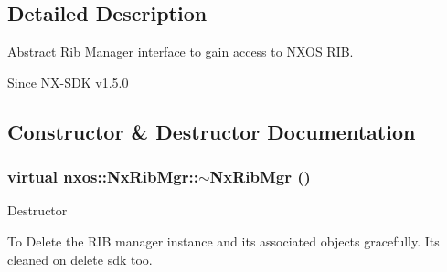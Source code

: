 \subsection{Detailed Description}
Abstract Rib Manager interface to gain access to NXOS RIB. \begin{DoxySince}{Since}
NX-\/SDK v1.5.0 
\end{DoxySince}


\subsection{Constructor \& Destructor Documentation}
\hypertarget{classnxos_1_1NxRibMgr_a5f390bcc244b9f5984d35290aea0e2cc}{
\subsubsection[{$\sim$NxRibMgr}]{\setlength{\rightskip}{0pt plus 5cm}virtual nxos::NxRibMgr::$\sim$NxRibMgr ()}}
\label{classnxos_1_1NxRibMgr_a5f390bcc244b9f5984d35290aea0e2cc}
Destructor

To Delete the RIB manager instance and its associated objects gracefully. Its cleaned on delete sdk too. 

